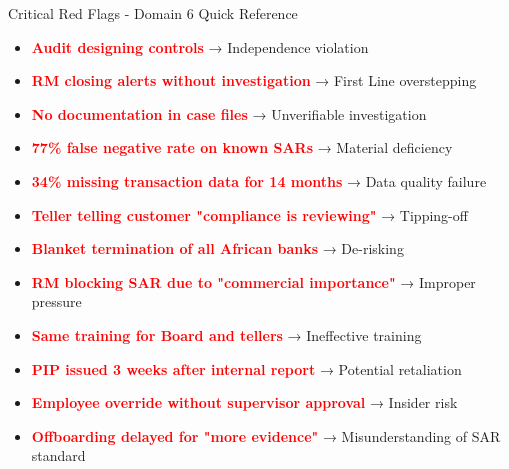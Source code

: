 \documentclass[11pt,a4paper]{beamer}
\newcommand{\redflag}[1]{\textcolor{red}{\textbf{#1}}}
\begin{document}
	\begin{frame}{Critical Red Flags - Domain 6 Quick Reference}
		\begin{itemize}
			\item \redflag{Audit designing controls} → Independence violation
			\item \redflag{RM closing alerts without investigation} → First Line overstepping
			\item \redflag{No documentation in case files} → Unverifiable investigation
			\item \redflag{77\% false negative rate on known SARs} → Material deficiency
			\item \redflag{34\% missing transaction data for 14 months} → Data quality failure
			\item \redflag{Teller telling customer "compliance is reviewing"} → Tipping-off
			\item \redflag{Blanket termination of all African banks} → De-risking
			\item \redflag{RM blocking SAR due to "commercial importance"} → Improper pressure
			\item \redflag{Same training for Board and tellers} → Ineffective training
			\item \redflag{PIP issued 3 weeks after internal report} → Potential retaliation
			\item \redflag{Employee override without supervisor approval} → Insider risk
			\item \redflag{Offboarding delayed for "more evidence"} → Misunderstanding of SAR standard
		\end{itemize}
	\end{frame}
	
\end{document}
